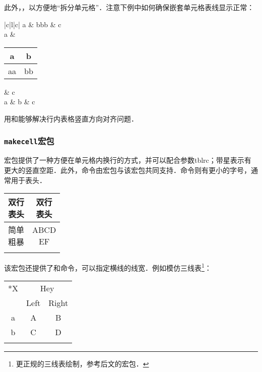 此外，，以方便地“拆分单元格”．注意下例中如何确保嵌套单元格表线显示正常：

\begin{codeshow}
\begin{tabular}{|c|l|c|}
\hline
a & bbb & c \\ \hline
a & 
{\begin{tabular}{c|c}
a & b \\ \hline
aa & bb \\
\end{tabular}}
& c \\ \hline
a & b & c \\ \hline
\end{tabular}
\end{codeshow}

用和能够解决行内表格竖直方向对齐问题．

\subsubsection{\texttt{makecell}宏包}
宏包提供了一种方便在单元格内换行的方式，并可以配合参数tblrc；带星表示有更大的竖直空距．此外，命令由宏包与该宏包共同支持．命令则有更小的字号，通常用于表头．
\begin{codeshow}
\begin{tabular}{|c|c|}
\hline
\thead{双行\\表头} & \thead{双行\\表头}\\
\hline
\multirowcell{2}{简单\\粗暴} & \makecell[l]{ABCD\\EF} \\
\cline{2-2} & \makecell*{更大的竖直空距} \\
\hline
\end{tabular}
\end{codeshow}

该宏包还提供了和命令，可以指定横线的线宽．例如模仿三线表\footnote{更正规的三线表绘制，参考后文的宏包．}：
\begin{codeshow}
\begin{tabular}{ccc}
\Xhline{2pt}
\multirow{2}*{X} & 
\multicolumn{2}{c}{Hey}\\
\Xcline{2-3}{0.4pt}
& Left & Right \\
\Xhline{1pt} 
a & A & B \\
b & C & D \\
\Xhline{2pt}
\end{tabular}
\end{codeshow}

